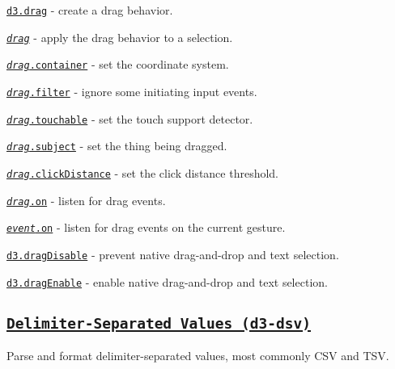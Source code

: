 \begin{DoxyItemize}
\item \href{https://github.com/d3/d3-drag/blob/master/README.md#drag}{\tt d3.\+drag} -\/ create a drag behavior.
\item \href{https://github.com/d3/d3-drag/blob/master/README.md#_drag}{\tt {\itshape drag}} -\/ apply the drag behavior to a selection.
\item \href{https://github.com/d3/d3-drag/blob/master/README.md#drag_container}{\tt {\itshape drag}.container} -\/ set the coordinate system.
\item \href{https://github.com/d3/d3-drag/blob/master/README.md#drag_filter}{\tt {\itshape drag}.filter} -\/ ignore some initiating input events.
\item \href{https://github.com/d3/d3-drag/blob/master/README.md#drag_touchable}{\tt {\itshape drag}.touchable} -\/ set the touch support detector.
\item \href{https://github.com/d3/d3-drag/blob/master/README.md#drag_subject}{\tt {\itshape drag}.subject} -\/ set the thing being dragged.
\item \href{https://github.com/d3/d3-drag/blob/master/README.md#drag_clickDistance}{\tt {\itshape drag}.click\+Distance} -\/ set the click distance threshold.
\item \href{https://github.com/d3/d3-drag/blob/master/README.md#drag_on}{\tt {\itshape drag}.on} -\/ listen for drag events.
\item \href{https://github.com/d3/d3-drag/blob/master/README.md#event_on}{\tt {\itshape event}.on} -\/ listen for drag events on the current gesture.
\item \href{https://github.com/d3/d3-drag/blob/master/README.md#dragDisable}{\tt d3.\+drag\+Disable} -\/ prevent native drag-\/and-\/drop and text selection.
\item \href{https://github.com/d3/d3-drag/blob/master/README.md#dragEnable}{\tt d3.\+drag\+Enable} -\/ enable native drag-\/and-\/drop and text selection.
\end{DoxyItemize}

\subsection*{\href{https://github.com/d3/d3-dsv}{\tt Delimiter-\/\+Separated Values (d3-\/dsv)}}

Parse and format delimiter-\/separated values, most commonly C\+SV and T\+SV.


